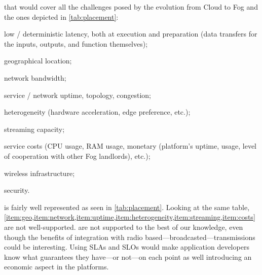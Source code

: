 \begin{description}[leftmargin=10pt]
	\item[Lack of \acrfullpl{SLA}] that would cover all the challenges posed by the evolution from Cloud to Fog \cite{chiang_fog_2016, bonomi_fog_2012} and the ones depicted in \cref{tab:placement}:
		\begin{enumerate*}[(1)]
			\item \label{item:latency} low / deterministic latency, both at execution and preparation (data transfers for the inputs, outputs, and function themselves);
			\item \label{item:geo} geographical location;
			\item \label{item:network} network bandwidth;
			\item \label{item:uptime} service / network uptime, topology, congestion;
			\item \label{item:heterogeneity} heterogeneity (hardware acceleration, edge preference, etc.);
			\item \label{item:streaming} streaming capacity;
			\item \label{item:costs} service costs (CPU usage, RAM usage, monetary (platform's uptime, usage, level of cooperation with other Fog landlords), etc.);
			\item \label{item:wireless} wireless infrastructure;
			\item \label{item:security} security.
		\end{enumerate*}
		 is fairly well represented as seen in \cref{tab:placement}. Looking at the same table, \cref{item:geo,item:network,item:uptime,item:heterogeneity,item:streaming,item:costs} are not well-supported.  are not supported to the best of our knowledge, even though the benefits of integration with radio based—broadcasted—transmissions could be interesting. Using \glspl{SLA} and \glspl{SLO} would make application developers know what guarantees they have—or not—on each point as well introducing an economic aspect in the platforms.


\end{description}
